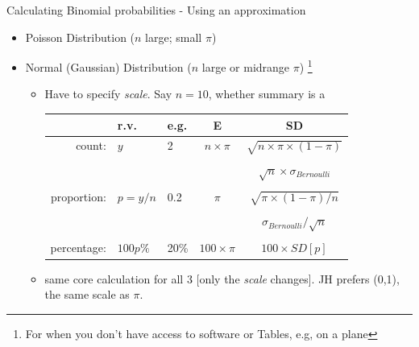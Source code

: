 \documentclass[10pt,handout]{beamer}\usepackage[]{graphicx}\usepackage[]{color}
\begin{document}
\begin{frame}{Calculating Binomial probabilities - Using an approximation}
	
	\small
	\begin{itemize}
		\item Poisson Distribution ($n$ large;  small $\pi$)
		\item Normal (Gaussian) Distribution ($n$ large or midrange $\pi $) \footnote{\footnotesize
			For when you don't have access to software or Tables, e.g, on a plane} 
		\begin{itemize}
			\item Have to specify \textit{scale}. Say $n=10$, whether summary is a 
			\begin{tabular}{rllcc}
				&  \textbf{r.v. }        &  \textbf{e.g.} & \textbf{E} & \textbf{SD} \\ 
				\hline
				count:          &  $y$        &  2 & $n \times \pi$ & $\sqrt{n \times \pi \times (1-\pi)}$ \\
				& & & & \\
				& & & & $\sqrt{n} \times \sigma_{Bernoulli}$ \\
				
				& & & & \\
				proportion:   & $p=y/n$  & 0.2 & $ \pi$ & $ \sqrt{\pi \times (1-\pi) / n}$ \\
				& & & & \\
				
				& & & &  $\sigma_{Bernoulli} / \sqrt{n}$\\
				
				& & & & \\
				percentage: &$100p\%$ & 20\% & $100 \times \pi$ & $100 \times SD[p]$ \\
				\hline
			\end{tabular}
			\item same core calculation for all 3 [only the \textit{scale} changes]. JH prefers (0,1), the same scale as $\pi.$
			
		\end{itemize}
		
	\end{itemize}
	
\end{frame}
\end{document}
